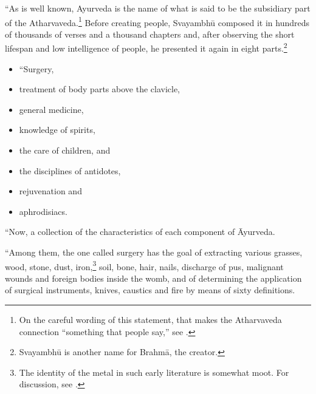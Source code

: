 \begin{translation}
“As is well known, Ayurveda is the name of what is said to be the
subsidiary part of the Atharvaveda.\footnote{On the careful wording of
    this statement, that makes the Atharvaveda connection “something that
    people say,” see \cite[400--401]{wuja-2022}.} Before creating people,
    Svayambhū composed it in hundreds of thousands of verses and a
    thousand chapters and, after observing the short lifespan and low
    intelligence of people, he presented it again in eight
    parts.\footnote{Svayambhū is another name for Brahmā, the creator.}
    
    \item[7] 
    
\begin{itemize}
    \item “Surgery, 
    \item treatment of body parts above the clavicle, 
    \item general medicine, 
    \item knowledge of spirits, 
    \item the care of children, and 
    \item the disciplines of antidotes, 
    \item rejuvenation and 
    \item aphrodisiacs. %
\end{itemize}
    
    \item[8.1] 
    
“Now,  a collection of the characteristics of each component of
Āyurveda.
    
    \item[8.1a] 
    
“Among them, the one called surgery has the goal of extracting
various grasses, wood, stone, dust, iron,\footnote{The identity of
    the metal in such early literature is somewhat moot. For discussion,
    see \cite{wujad-2019}.} soil, bone, hair, nails, discharge of pus,
    malignant wounds and foreign bodies inside the womb, and of
    determining the application of surgical instruments, knives, caustics
    and fire by means of sixty definitions. %
    

\end{translation}
